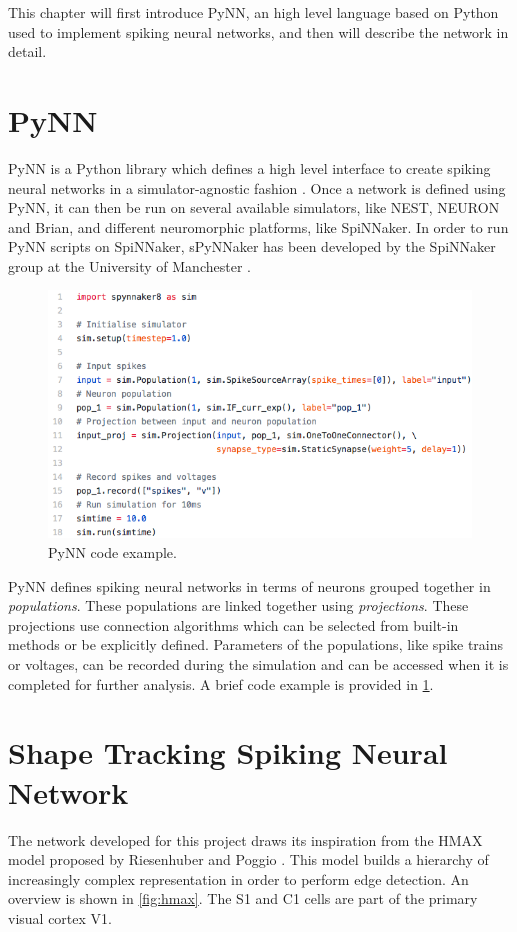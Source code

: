 This chapter will first introduce PyNN, an high level language based on Python used to implement spiking neural networks, and then will describe the network in detail.

\section{PyNN}
PyNN is a Python library which defines a high level interface to create spiking neural networks in a simulator-agnostic fashion \cite{Davison2008}. Once a network is defined using PyNN, it can then be run on several available simulators, like NEST, NEURON and Brian, and different neuromorphic platforms, like SpiNNaker. In order to run PyNN scripts on SpiNNaker, sPyNNaker has been developed by the SpiNNaker group at the University of Manchester \cite{Rhodes2018}.

\begin{figure}[ht]
\centering
\includegraphics[scale=0.5]{images/development/pynn_example.png}
\caption[PyNN Example]{PyNN code example.}
\label{fig:pynn_example}
\end{figure}

PyNN defines spiking neural networks in terms of neurons grouped together in \emph{populations}. These populations are linked together using \emph{projections}. These projections use connection algorithms which can be selected from built-in methods or be explicitly defined. Parameters of the populations, like spike trains or voltages, can be recorded during the simulation and can be accessed when it is completed for further analysis. A brief code example is provided in \cref{fig:pynn_example}. 

\section{Shape Tracking Spiking Neural Network}
The network developed for this project draws its inspiration from the HMAX model proposed by Riesenhuber and Poggio \cite{Riesenhuber1999}. This model builds a hierarchy of increasingly complex representation in order to perform edge detection. An overview is shown in \cref{fig:hmax}. The \textsc{S1} and \textsc{C1} cells are part of the primary visual cortex V1.  

